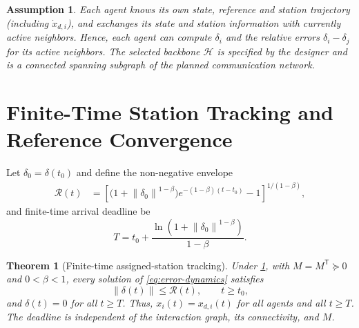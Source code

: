 \documentclass[letterpaper,10pt,conference]{ieeeconf}
\newcommand{\norm}[1]{\left\lVert #1 \right\rVert}
\newcommand{\trans}{^{\mathsf T}}
\newtheorem{theorem}{Theorem}
\newtheorem{assumption}{Assumption}
\begin{document}
\begin{assumption}
\label{ass:graph}
Each agent knows its own state, reference and station trajectory (including $\dot x_{d,i}$), and exchanges its state and station information with currently active neighbors. Hence, each agent can compute $\delta_i$ and the relative errors $\delta_i-\delta_j$ for its active neighbors. The selected backbone $\mathcal H$ is specified by the designer and is a connected spanning subgraph of the planned communication network.
\end{assumption}

\section{Finite-Time Station Tracking and Reference Convergence}
\label{sec:finite-time}
Let $\delta_0=\delta(t_0)$ and define the non-negative envelope
\begin{equation}
\begin{aligned}
\mathcal R(t)&=\left[\bigl(1+\norm{\delta_0}^{1-\beta}\bigr)
 e^{-(1-\beta)(t-t_0)}-1\right]^{1/(1-\beta)},
\end{aligned}
\label{eq:R-bound}
\end{equation}
and finite-time arrival deadline be
\begin{equation}
  T=t_0+\frac{\ln(1+\norm{\delta_0}^{1-\beta})}{1-\beta}.
  \label{eq:T-bound}
\end{equation}

\begin{theorem}[Finite-time assigned-station tracking]
\label{thm:station}
Under \cref{ass:graph}, with $M=M\trans\succeq0$ and $0<\beta<1$, every solution of \eqref{eq:error-dynamics} satisfies
\begin{equation}
  \norm{\delta(t)}\leq\mathcal R(t),\qquad t\geq t_0,
  \label{eq:station-envelope}
\end{equation}
and $\delta(t)=0$ for all $t\geq T$. Thus, $x_i(t)=x_{d,i}(t)$ for all agents and all $t\geq T$. The deadline is independent of the interaction graph, its connectivity, and $M$.
\end{theorem}
\end{document}
